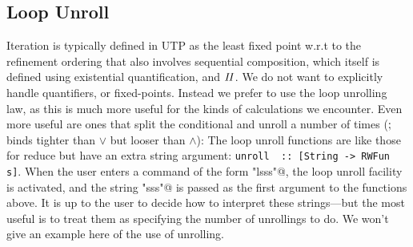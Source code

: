 \subsection{Loop Unroll}


Iteration is typically defined in UTP as the least fixed point
w.r.t to the refinement ordering
that also involves sequential composition,
which itself is defined using existential quantification,
and $\mathit{II}$.
We do not want to explicitly handle quantifiers,
or fixed-points.
Instead we prefer to use the loop unrolling law,
as this is much more useful for the kinds of calculations we encounter.
Even more useful are ones that split the conditional
and unroll a number of times ($\mathrel{;}$ binds tighter than $\lor$
but looser than $\land$):
The loop unroll functions are like those for reduce
but have an extra string argument: 
\verb"unroll  :: [String -> RWFun s]".
When the user enters a command of the form \verb@"lsss"@,
the loop unroll facility is activated,
and the string \verb@"sss"@ is passed as the first argument to the functions
above. It is up to the user to decide how to interpret
these strings---but the most useful is to treat them as specifying
the number of unrollings to do.
We won't give an example here of the use of unrolling.
%
%
%
%
%


